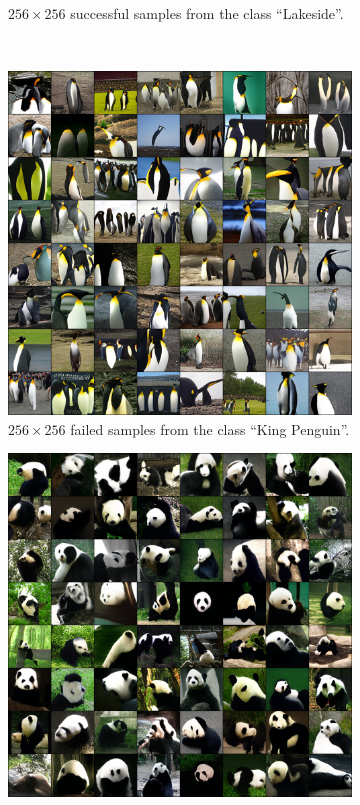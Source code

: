 \begin{figure}[ht]
\begin{subfigure}[b]{0.47\textwidth}
        \caption{
            $256 \times 256$ successful samples from the class ``Lakeside''.
        }
    \end{subfigure}\\
    \vspace{0.5cm}
    \begin{subfigure}[b]{0.47\textwidth}
        \centering
        \includegraphics[width=1.0\textwidth]{figures/imagenet-penguin-small.png}
        \caption{
            $256 \times 256$ failed samples from the class ``King Penguin''.
        }
    \end{subfigure}
    \hfill
    \begin{subfigure}[b]{0.47\textwidth}
        \centering
        \includegraphics[width=1.0\textwidth]{figures/imagenet-panda-small.png}

\end{subfigure}
\end{figure}
